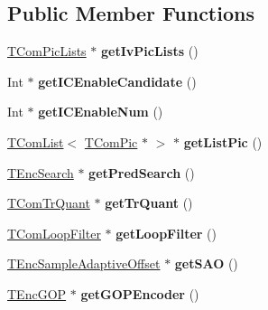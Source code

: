 \subsection*{Public Member Functions}
\begin{DoxyCompactItemize}
\item 
\mbox{\label{class_t_enc_top_a9d81e71709262abd3978ee8836dad2ba}} 
\hyperlink{class_t_com_pic_lists}{T\+Com\+Pic\+Lists} $\ast$ {\bfseries get\+Iv\+Pic\+Lists} ()
\item 
\mbox{\label{class_t_enc_top_ae252dd7bff9cddcb0cf6c34ee4cb1369}} 
Int $\ast$ {\bfseries get\+I\+C\+Enable\+Candidate} ()
\item 
\mbox{\label{class_t_enc_top_a0486dd71f8f424190d59e838f4b8d32b}} 
Int $\ast$ {\bfseries get\+I\+C\+Enable\+Num} ()
\item 
\mbox{\label{class_t_enc_top_ad9fe82afb205b8436c7ef68b98baf6ed}} 
\hyperlink{class_t_com_list}{T\+Com\+List}$<$ \hyperlink{class_t_com_pic}{T\+Com\+Pic} $\ast$ $>$ $\ast$ {\bfseries get\+List\+Pic} ()
\item 
\mbox{\label{class_t_enc_top_a4bd7cf8e41cfbfb65fa33ebecf9a5501}} 
\hyperlink{class_t_enc_search}{T\+Enc\+Search} $\ast$ {\bfseries get\+Pred\+Search} ()
\item 
\mbox{\label{class_t_enc_top_a9b60846bcf29fa6e56f8fbc9a242caed}} 
\hyperlink{class_t_com_tr_quant}{T\+Com\+Tr\+Quant} $\ast$ {\bfseries get\+Tr\+Quant} ()
\item 
\mbox{\label{class_t_enc_top_aa0128340021158ffaf9155225b84215b}} 
\hyperlink{class_t_com_loop_filter}{T\+Com\+Loop\+Filter} $\ast$ {\bfseries get\+Loop\+Filter} ()
\item 
\mbox{\label{class_t_enc_top_a60207a21d5023989b5d09f7cdec609e6}} 
\hyperlink{class_t_enc_sample_adaptive_offset}{T\+Enc\+Sample\+Adaptive\+Offset} $\ast$ {\bfseries get\+S\+AO} ()
\item 
\mbox{\label{class_t_enc_top_ad18f049db0c08d84a593e7352657388c}} 
\hyperlink{class_t_enc_g_o_p}{T\+Enc\+G\+OP} $\ast$ {\bfseries get\+G\+O\+P\+Encoder} ()

\end{DoxyCompactItemize}
